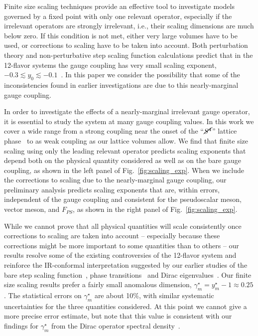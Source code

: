 \documentclass[prl, letterpaper, amsmath, amssymb, preprintnumbers, showpacs, superscriptaddress, twocolumn]{revtex4-1}
\newcommand{\lsim}{\ensuremath{\lesssim} }
\newcommand{\Sb}{\ensuremath{\cancel{S^4}} }
\newcommand{\fig}[1]{Fig.~\ref{#1}}
\begin{document}
Finite size scaling techniques provide an effective tool to investigate models governed by a fixed point with only one relevant operator, especially if the irrelevant operators are strongly irrelevant, i.e., their scaling dimensions are much below zero.
If this condition is not met, either very large volumes have to be used, or corrections to scaling have to be taken into account.
Both perturbation theory and non-perturbative step scaling function calculations predict that in the 12-flavor systems the gauge coupling has very small scaling exponent, $-0.3 \lsim y_0 \lsim -0.1$~\cite{Ryttov:2010iz, Appelquist:2009ty}.
In this paper we consider the possibility that some of the inconsistencies found in earlier investigations are due to this nearly-marginal gauge coupling.

In order to investigate the effects of a nearly-marginal irrelevant gauge operator, it is essential to study the system at many gauge coupling values.
In this work we cover a wide range from a strong coupling near the onset of the ``$\Sb$'' lattice phase~\cite{Cheng:2011ic} to as weak coupling as our lattice volumes allow.
We find that finite size scaling using only the leading relevant operator predicts scaling exponents that depend both on the physical quantity considered as well as on the bare gauge coupling, as shown in the left panel of \fig{fig:scaling_exp}.
When we include the corrections to scaling due to the nearly-marginal gauge coupling, our preliminary analysis predicts scaling exponents that are, within errors, independent of the gauge coupling and consistent for the pseudoscalar meson, vector meson, and $F_{PS}$, as shown in the right panel of \fig{fig:scaling_exp}.

While we cannot prove that all physical quantities will scale consistently once corrections to scaling are taken into account -- especially because these corrections might be more important to some quantities than to others -- our results resolve some of the existing controversies of the 12-flavor system and reinforce the IR-conformal interpretation suggested by our earlier studies of the bare step scaling function~\cite{Hasenfratz:2011xn}, phase transitions~\cite{Hasenfratz:2013uha} and Dirac eigenvalues~\cite{Cheng:2013eu}.
Our finite size scaling results prefer a fairly small anomalous dimension, $\gamma_m^{\star} = y_m^{\star} - 1 \approx 0.25$.
The statistical errors on $\gamma_m^{\star}$ are about 10\%, with similar systematic uncertainties for the three quantities considered.
At this point we cannot give a more precise error estimate, but note that this value is consistent with our findings for $\gamma_m^{\star}$ from the Dirac operator spectral density~\cite{Cheng:2013eu}.
\end{document}
